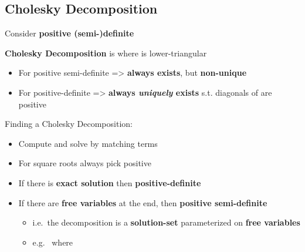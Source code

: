 \subsection*{Cholesky Decomposition}


Consider \textbf{positive (semi-)definite}

\textbf{Cholesky Decomposition} is  where 
is lower-triangular
\begin{itemize}

      \item
            For positive semi-definite => \textbf{always exists},
            but \textbf{non-unique}
      \item
            For positive-definite => \textbf{always \emph{uniquely}
                  exists} s.t. diagonals of  are positive
\end{itemize}

\hSep %

Finding a Cholesky Decomposition:
\begin{itemize}

      \item
            Compute  and solve  by matching terms
      \item
            For square roots always pick positive
      \item
            If there is \textbf{exact solution} then \textbf{positive-definite}
      \item
            If there are \textbf{free variables} at the end, then
            \textbf{positive semi-definite}

            \begin{itemize}

                  \item
                        i.e.~the decomposition is a \textbf{solution-set} parameterized on
                        \textbf{free variables}
                  \item
                        e.g.~
                        where
            \end{itemize}
\end{itemize}


